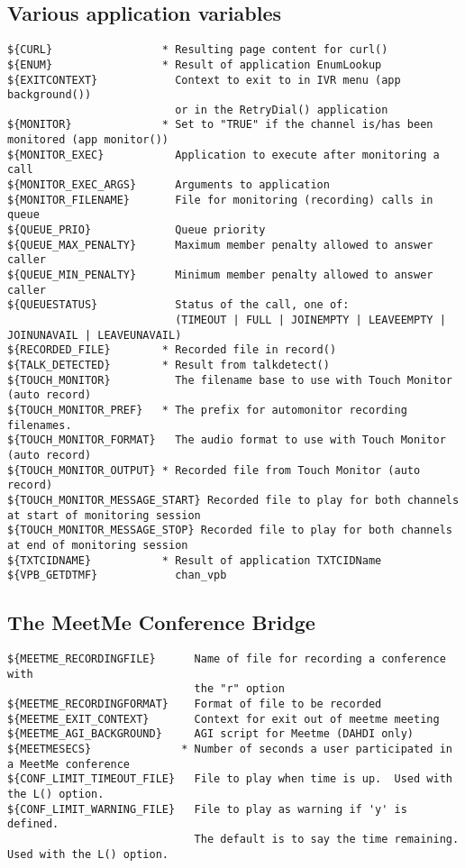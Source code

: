 \subsection{Various application variables}
\begin{verbatim}
${CURL}                 * Resulting page content for curl()
${ENUM}                 * Result of application EnumLookup
${EXITCONTEXT}            Context to exit to in IVR menu (app background())
                          or in the RetryDial() application
${MONITOR}              * Set to "TRUE" if the channel is/has been monitored (app monitor())
${MONITOR_EXEC}           Application to execute after monitoring a call
${MONITOR_EXEC_ARGS}      Arguments to application
${MONITOR_FILENAME}       File for monitoring (recording) calls in queue
${QUEUE_PRIO}             Queue priority
${QUEUE_MAX_PENALTY}      Maximum member penalty allowed to answer caller
${QUEUE_MIN_PENALTY}      Minimum member penalty allowed to answer caller
${QUEUESTATUS}            Status of the call, one of:
                          (TIMEOUT | FULL | JOINEMPTY | LEAVEEMPTY | JOINUNAVAIL | LEAVEUNAVAIL)
${RECORDED_FILE}        * Recorded file in record()
${TALK_DETECTED}        * Result from talkdetect()
${TOUCH_MONITOR}          The filename base to use with Touch Monitor (auto record)
${TOUCH_MONITOR_PREF}   * The prefix for automonitor recording filenames.
${TOUCH_MONITOR_FORMAT}   The audio format to use with Touch Monitor (auto record)
${TOUCH_MONITOR_OUTPUT} * Recorded file from Touch Monitor (auto record)
${TOUCH_MONITOR_MESSAGE_START} Recorded file to play for both channels at start of monitoring session
${TOUCH_MONITOR_MESSAGE_STOP} Recorded file to play for both channels at end of monitoring session
${TXTCIDNAME}           * Result of application TXTCIDName
${VPB_GETDTMF}            chan_vpb
\end{verbatim}

\subsection{The MeetMe Conference Bridge}
\begin{verbatim}
${MEETME_RECORDINGFILE}      Name of file for recording a conference with
                             the "r" option
${MEETME_RECORDINGFORMAT}    Format of file to be recorded
${MEETME_EXIT_CONTEXT}       Context for exit out of meetme meeting
${MEETME_AGI_BACKGROUND}     AGI script for Meetme (DAHDI only)
${MEETMESECS}              * Number of seconds a user participated in a MeetMe conference
${CONF_LIMIT_TIMEOUT_FILE}   File to play when time is up.  Used with the L() option.
${CONF_LIMIT_WARNING_FILE}   File to play as warning if 'y' is defined.
                             The default is to say the time remaining.  Used with the L() option.
\end{verbatim}

